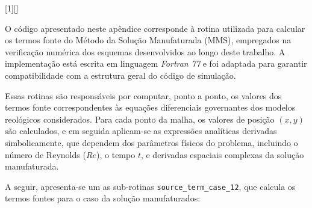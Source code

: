 [1][]{  
  \lstset{language=Fortran77, #1}  
}{}

O código apresentado neste apêndice corresponde à rotina utilizada para calcular os termos fonte do Método da Solução Manufaturada (MMS), empregados na verificação numérica dos esquemas desenvolvidos ao longo deste trabalho. A implementação está escrita em linguagem \textit{Fortran 77} e foi adaptada para garantir compatibilidade com a estrutura geral do código de simulação.

Essas rotinas são responsáveis por computar, ponto a ponto, os valores dos termos fonte correspondentes às equações diferenciais governantes dos modelos reológicos considerados. Para cada ponto da malha, os valores de posição $(x, y)$ são calculados, e em seguida aplicam-se as expressões analíticas derivadas simbolicamente, que dependem dos parâmetros físicos do problema, incluindo o número de Reynolds ($Re$), o tempo $t$, e derivadas espaciais complexas da solução manufaturada.

A seguir, apresenta-se um as sub-rotinas \texttt{source\_term\_case\_12}, que calcula os termos fontes para o caso da solução manufaturados:

